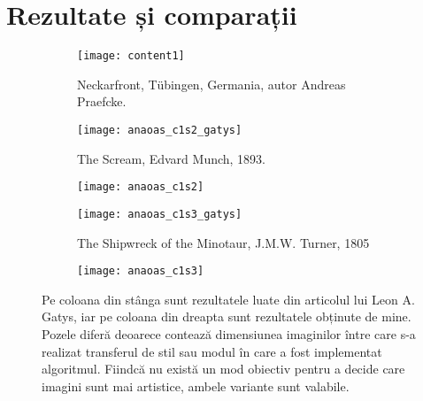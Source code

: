 \section{Rezultate și comparații}
\begin{figure}[H]
	\centering
    \begin{subfigure}[b]{0.75\textwidth}
		\centering
        \texttt{[image: content1]}
        \label{fig:content}
        \caption{Neckarfront, Tübingen, Germania, autor Andreas Praefcke.}
	\end{subfigure}
    \begin{subfigure}[b]{0.5\textwidth}
		\centering
        \texttt{[image: anaoas\_c1s2\_gatys]}
        \label{fig:anaoas_c1s2_gatys}
        \caption{The Scream, Edvard Munch, 1893.}
	\end{subfigure}
    \hfill
    \begin{subfigure}[b]{0.4\textwidth}
		\centering
        \texttt{[image: anaoas\_c1s2]}
        \label{fig:anaoas_c1s2}
	\end{subfigure}
    \begin{subfigure}[b]{0.5\textwidth}
		\centering
        \texttt{[image: anaoas\_c1s3\_gatys]}
        \label{fig:anaoas_c1s3_gatys}
        \caption{The Shipwreck of the Minotaur, J.M.W. Turner, 1805}
	\end{subfigure}
    \hfill
    \begin{subfigure}[b]{0.4\textwidth}
		\centering
        \texttt{[image: anaoas\_c1s3]}
        \label{fig:anaoas_c1s3}
	\end{subfigure}
    \caption{Pe coloana din stânga sunt rezultatele luate din articolul lui Leon A. Gatys, iar pe coloana din dreapta sunt rezultatele obținute de mine. Pozele diferă deoarece contează dimensiunea imaginilor între care s-a realizat transferul de stil sau modul în care a fost implementat algoritmul. Fiindcă nu există un mod obiectiv pentru a decide care imagini sunt mai artistice, ambele variante sunt valabile.}
\end{figure}

